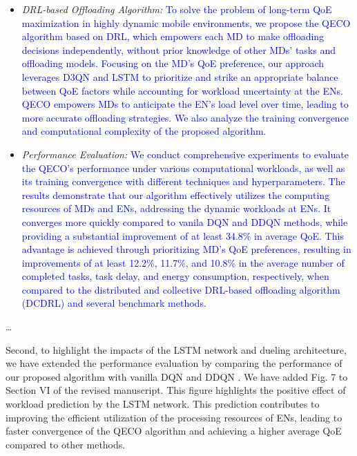 \documentclass[12pt,draftclsnofoot,onecolumn]{IEEEtran}
\newenvironment{my}[2]%
{\begin{list}{}%
{\setlength{\rightmargin}{#1}\setlength{\leftmargin}{#2}}%


 \item[]{}

} {\end{list}}
\begin{document}
\begin{enumerate}
\begin{my}{1cm}{1cm}
{{\begin{itemize}
	
	
	\item \textit{DRL-based Offloading Algorithm:} \textcolor{blue}{To solve the problem of long-term QoE maximization in highly dynamic mobile environments, we propose the QECO algorithm based on DRL, which empowers each MD to make offloading decisions independently, without prior knowledge of other MDs' tasks and offloading models. Focusing on the MD's QoE preference, our approach leverages D3QN and LSTM to prioritize and strike an appropriate balance between QoE factors while accounting for workload uncertainty at the ENs. QECO empowers MDs to anticipate the EN's load level over time, leading to more accurate offloading strategies. We also analyze the training convergence and computational complexity of the proposed algorithm.}
	
	\item \textit{Performance Evaluation:} \textcolor{blue}{We conduct comprehensive experiments to evaluate the QECO's performance under various computational workloads, as well as its training convergence with different techniques and hyperparameters. The results demonstrate that our algorithm effectively utilizes the computing resources of MDs and ENs, addressing the dynamic workloads at ENs. It converges more quickly compared to vanila DQN and DDQN methods, while providing a substantial improvement of at least 34.8\% in average QoE. This advantage is achieved through prioritizing MD's QoE preferences, resulting in improvements of at least 12.2\%, 11.7\%, and 10.8\% in the average number of completed tasks, task delay, and energy consumption, respectively, when compared to the distributed and collective DRL-based offloading algorithm (DCDRL) \cite{qiu2020distributed} and several benchmark methods.}
	
	
	
\end{itemize}

\dots
}}
\end{my}
\vspace{5mm}

Second, to highlight the impacts of the LSTM network and dueling architecture, we have extended the performance evaluation by comparing the performance of our proposed algorithm with vanilla DQN and DDQN \cite{van2016deep}. We have added Fig. 7 to Section VI of the revised manuscript.
This figure highlights the positive effect of workload prediction by the LSTM network. This prediction contributes to improving the efficient utilization of the processing resources of ENs, leading to faster convergence of the QECO algorithm and achieving a higher average QoE compared to other methods. 


\end{enumerate}
\end{document}
